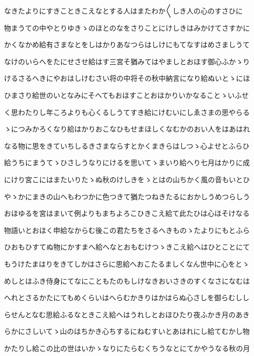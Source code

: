 \documentclass[a4paper,11pt,landscape]{ltjtarticle}
\begin{document}
\par\medskip
なきたよりにすきこときこえなとする人はまたわか〱しき人の心のすさひに
\par\medskip
物まうての中やとりゆきゝのほとのなをさりことにけしきはみかけてさすかに
\par\medskip
かくなかめ給有さまなとをしはかりあなつらはしけにもてなすはめさましうて
\par\medskip
なけのいらへをたにせさせ給はす三宮そ猶みてはやましとおほす御心ふかゝり
\par\medskip
けるさるへきにやおはしけむさい将の中将その秋中納言になり給ぬいとゝにほ
\par\medskip
ひまさり給世のいとなみにそへてもおほすことおほかりいかなることゝいふせ
\par\medskip
く思わたりし年ころよりも心くるしうてすき給にけむいにしゑさまの思やらる
\par\medskip
ゝにつみかろくなり給はかりおこなひもせまほしくなむかのおい人をはあはれ
\par\medskip
なる物に思をきていちしるきさまならすとかくまきらはしつゝ心よせとふらひ
\par\medskip
給うちにまうてゝひさしうなりにけるを思いてゝまいり給へり七月はかりに成
\par\medskip
にけり宮こにはまたいりたゝぬ秋のけしきをゝとはの山ちかく風の音もいとひ
\par\medskip
やゝかにまきの山へもわつかに色つきて猶たつねきたるにおかしうめつらしう
\par\medskip
おほゆるを宮はまいて例よりもまちよろこひきこえ給て此たひは心ほそけなる
\par\medskip
物語いとおほく申給なからむ後この君たちをさるへきものゝたよりにもとふら
\par\medskip
ひおもひすてぬ物にかすまへ給へなとおもむけつゝきこえ給へはひとことにて
\par\medskip
もうけたまはりをきてしかはさらに思給へおこたるましくなん世中に心をとゝ
\par\medskip
めしとはふき侍身にてなにこともたのもしけなきおいさきのすくなさになむは
\par\medskip
へれとさるかたにてもめくらいはへらむかきりはかはらぬ心さしを御らむしし
\par\medskip
らせんとなむ思給ふるなときこえ給へはうれしとおほひたり夜ふかき月のあき
\par\medskip
らかにさしいてゝ山のはちかき心ちするにねむすいとあはれにし給てむかし物
\par\medskip
かたりし給この比の世はいかゝなりにたらむくちうなとにてかやうなる秋の月
\end{document}
